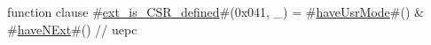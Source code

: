 function clause #\hyperref[sailRISCVzextzyiszyCSRzydefined]{ext\_is\_CSR\_defined}#(0x041, _) = #\hyperref[sailRISCVzhaveUsrMode]{haveUsrMode}#() & #\hyperref[sailRISCVzhaveNExt]{haveNExt}#() // uepc
